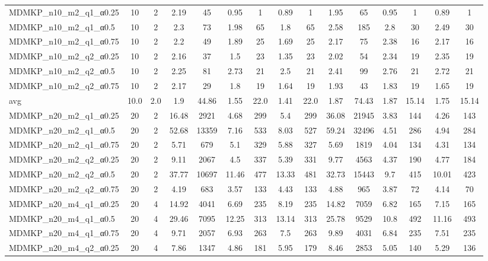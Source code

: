 \begin{table}[!ht]
{\begin{tabular}{lcccccccccccccc}
MDMKP\_n10\_m2\_q1\_α0.25 & 10 & 2 & 2.19 & 45 & 0.95 & 1 & 0.89 & 1 & 1.95 & 65 & 0.95 & 1 & 0.89 & 1 \\
MDMKP\_n10\_m2\_q1\_α0.5 & 10 & 2 & 2.3 & 73 & 1.98 & 65 & 1.8 & 65 & 2.58 & 185 & 2.8 & 30 & 2.49 & 30 \\
MDMKP\_n10\_m2\_q1\_α0.75 & 10 & 2 & 2.2 & 49 & 1.89 & 25 & 1.69 & 25 & 2.17 & 75 & 2.38 & 16 & 2.17 & 16 \\
MDMKP\_n10\_m2\_q2\_α0.25 & 10 & 2 & 2.16 & 37 & 1.5 & 23 & 1.35 & 23 & 2.02 & 54 & 2.34 & 19 & 2.35 & 19 \\
MDMKP\_n10\_m2\_q2\_α0.5 & 10 & 2 & 2.25 & 81 & 2.73 & 21 & 2.5 & 21 & 2.41 & 99 & 2.76 & 21 & 2.72 & 21 \\
MDMKP\_n10\_m2\_q2\_α0.75 & 10 & 2 & 2.17 & 29 & 1.8 & 19 & 1.64 & 19 & 1.93 & 43 & 1.83 & 19 & 1.65 & 19 \\
\hline avg & 10.0 & 2.0 & 1.9& 44.86 & 1.55& 22.0 & 1.41& 22.0 & 1.87& 74.43 & 1.87& 15.14 & 1.75& 15.14\\ \hline
MDMKP\_n20\_m2\_q1\_α0.25 & 20 & 2 & 16.48 & 2921 & 4.68 & 299 & 5.4 & 299 & 36.08 & 21945 & 3.83 & 144 & 4.26 & 143 \\
MDMKP\_n20\_m2\_q1\_α0.5 & 20 & 2 & 52.68 & 13359 & 7.16 & 533 & 8.03 & 527 & 59.24 & 32496 & 4.51 & 286 & 4.94 & 284 \\
MDMKP\_n20\_m2\_q1\_α0.75 & 20 & 2 & 5.71 & 679 & 5.1 & 329 & 5.88 & 327 & 5.69 & 1819 & 4.04 & 134 & 4.31 & 134 \\
MDMKP\_n20\_m2\_q2\_α0.25 & 20 & 2 & 9.11 & 2067 & 4.5 & 337 & 5.39 & 331 & 9.77 & 4563 & 4.37 & 190 & 4.77 & 184 \\
MDMKP\_n20\_m2\_q2\_α0.5 & 20 & 2 & 37.77 & 10697 & 11.46 & 477 & 13.33 & 481 & 32.73 & 15443 & 9.7 & 415 & 10.01 & 423 \\
MDMKP\_n20\_m2\_q2\_α0.75 & 20 & 2 & 4.19 & 683 & 3.57 & 133 & 4.43 & 133 & 4.88 & 965 & 3.87 & 72 & 4.14 & 70 \\
MDMKP\_n20\_m4\_q1\_α0.25 & 20 & 4 & 14.92 & 4041 & 6.69 & 235 & 8.19 & 235 & 14.82 & 7059 & 6.82 & 165 & 7.15 & 165 \\
MDMKP\_n20\_m4\_q1\_α0.5 & 20 & 4 & 29.46 & 7095 & 12.25 & 313 & 13.14 & 313 & 25.78 & 9529 & 10.8 & 492 & 11.16 & 493 \\
MDMKP\_n20\_m4\_q1\_α0.75 & 20 & 4 & 9.71 & 2057 & 6.93 & 263 & 7.5 & 263 & 9.89 & 4031 & 6.84 & 235 & 7.51 & 235 \\
MDMKP\_n20\_m4\_q2\_α0.25 & 20 & 4 & 7.86 & 1347 & 4.86 & 181 & 5.95 & 179 & 8.46 & 2853 & 5.05 & 140 & 5.29 & 136 \\

\end{tabular}}
\end{table}
